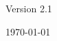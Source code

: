 
\begin{center}
\begin{bfseries}
\bigskip
\bigskip

Version 2.1

\bigskip

\today

\end{bfseries}
\end{center}
